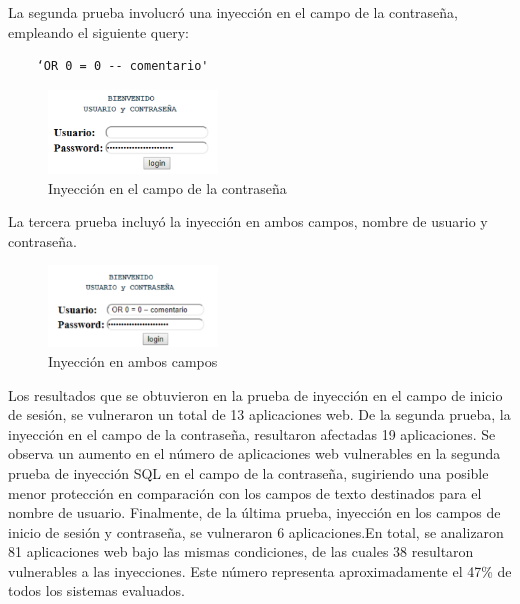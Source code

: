 \documentclass[11pt]{report}
\begin{document}
\cleardoublepage

La segunda prueba involucró una inyección en el campo de la contraseña, empleando el siguiente query: 
\begin{center}
  \begin{BVerbatim}
    ‘OR 0 = 0 -- comentario'
  \end{BVerbatim}
\end{center}

\begin{figure}[H]
  \centering
  \includegraphics[width=0.4\textwidth]{img/inyeccion_2.png}
  \caption{Inyección en el campo de la contraseña}
  \label{fig:inyeccion2}
\end{figure}

La tercera prueba incluyó la inyección en ambos campos, nombre de usuario y contraseña.
\begin{figure}[H]
  \centering
  \includegraphics[width=0.4\textwidth]{img/inyeccion_3.png}
  \caption{Inyección en ambos campos}
  \label{fig:inyeccion3}
\end{figure}

Los resultados que se obtuvieron en la prueba de inyección en el campo de inicio de sesión, se vulneraron un total de 13 aplicaciones web. 
De la segunda prueba, la inyección en el campo de la contraseña, resultaron afectadas 19 aplicaciones. Se observa un aumento en el número de aplicaciones 
web vulnerables en la segunda prueba de inyección SQL en el campo de la contraseña, sugiriendo una posible menor protección en comparación con los campos
de texto destinados para el nombre de usuario. Finalmente, de la última prueba, inyección en los campos de inicio de sesión y contraseña, se vulneraron 
6 aplicaciones.En total, se analizaron 81 aplicaciones web bajo las mismas condiciones, de las cuales 38 resultaron vulnerables a las inyecciones. Este 
número representa aproximadamente el 47\% de todos los sistemas evaluados.
\end{document}
